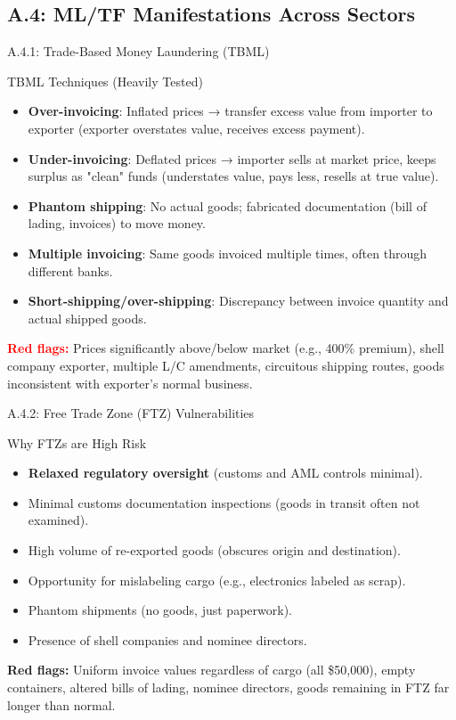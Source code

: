 \documentclass{beamer}
\begin{document}
	\subsection{A.4: ML/TF Manifestations Across Sectors}
	
	\begin{frame}{A.4.1: Trade-Based Money Laundering (TBML)}
		\begin{block}{TBML Techniques (Heavily Tested)}
			\begin{itemize}
				\item \textbf{Over-invoicing}: Inflated prices → transfer excess value from importer to exporter (exporter overstates value, receives excess payment).
				\item \textbf{Under-invoicing}: Deflated prices → importer sells at market price, keeps surplus as "clean" funds (understates value, pays less, resells at true value).
				\item \textbf{Phantom shipping}: No actual goods; fabricated documentation (bill of lading, invoices) to move money.
				\item \textbf{Multiple invoicing}: Same goods invoiced multiple times, often through different banks.
				\item \textbf{Short-shipping/over-shipping}: Discrepancy between invoice quantity and actual shipped goods.
			\end{itemize}
		\end{block}
		\vspace{0.2cm}
		\textcolor{red}{\textbf{ Red flags:}} Prices significantly above/below market (e.g., 400\% premium), shell company exporter, multiple L/C amendments, circuitous shipping routes, goods inconsistent with exporter's normal business.
	\end{frame}
	
	\begin{frame}{A.4.2: Free Trade Zone (FTZ) Vulnerabilities}
		\begin{block}{Why FTZs are High Risk}
			\begin{itemize}
				\item \textbf{Relaxed regulatory oversight} (customs and AML controls minimal).
				\item Minimal customs documentation inspections (goods in transit often not examined).
				\item High volume of re-exported goods (obscures origin and destination).
				\item Opportunity for mislabeling cargo (e.g., electronics labeled as scrap).
				\item Phantom shipments (no goods, just paperwork).
				\item Presence of shell companies and nominee directors.
			\end{itemize}
		\end{block}
		\textbf{Red flags:} Uniform invoice values regardless of cargo (all \$50,000), empty containers, altered bills of lading, nominee directors, goods remaining in FTZ far longer than normal.
	\end{frame}
	
\end{document}
